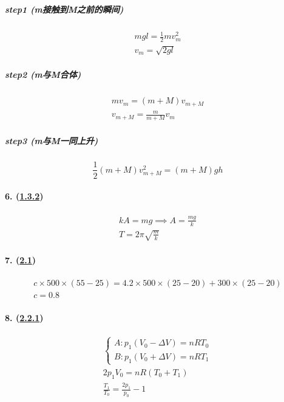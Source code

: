 \subparagraph{step1 (m接触到M之前的瞬间)}

\begin{gather*}
    mgl=\frac12mv_m^2\\
    v_m=\sqrt{2gl}
\end{gather*}

\subparagraph{step2 (m与M合体)}

\begin{gather*}
    mv_m=(m+M)v_{m+M}\\
    v_{m+M}=\frac{m}{m+M}v_m
\end{gather*}

\subparagraph{step3 (m与M一同上升)}

\begin{equation*}
    \frac12(m+M)v_{m+M}^2=(m+M)gh
\end{equation*}

\paragraph{6. (\hyperref[subsec:1.3.2]{1.3.2})}

\begin{gather*}
    kA=mg\implies A=\frac{mg}{k}\\
    T=2\pi\sqrt{\frac{m}{k}}
\end{gather*}

\paragraph{7. (\hyperref[sec:2.1]{2.1})}

\begin{gather*}
    c\times500\times(55-25)=4.2\times500\times(25-20)+300\times(25-20)\\
    c=0.8
\end{gather*}

\paragraph{8. (\hyperref[subsec:2.2.1]{2.2.1})}

\begin{gather*}
    \begin{cases}
        A: p_1(V_0-\Delta V)=nRT_0\\
        B: p_1(V_0+\Delta V)=nRT_1
    \end{cases}\\
    2p_1V_0=nR(T_0+T_1)\\
    \frac{T_1}{T_0}=\frac{2p_1}{p_0}-1
\end{gather*}

